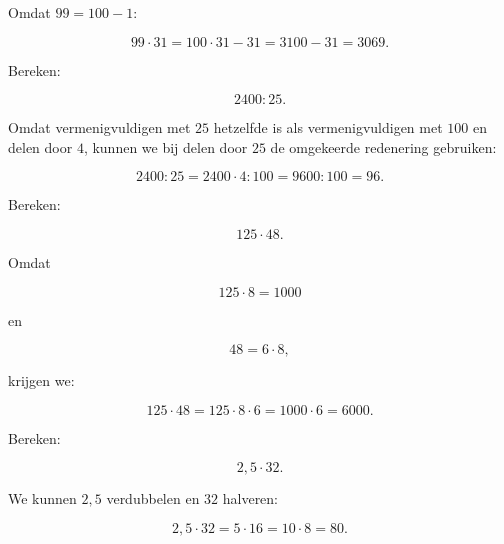 \documentclass{ximera}
\begin{document}
\begin{oefening}{\oefU\ESS}
\begin{question}
\begin{oplossing}
Omdat \(99=100-1\):

\[
99\cdot31
=
100\cdot31-31
=
3100-31
=
3069.
\]

\end{oplossing}

\end{question}


\begin{question}

Bereken:

\[
2400:25.
\]

\begin{oplossing}

Omdat vermenigvuldigen met \(25\) hetzelfde is als vermenigvuldigen met
\(100\) en delen door \(4\), kunnen we bij delen door \(25\) de omgekeerde
redenering gebruiken:

\[
2400:25
=
2400\cdot4:100
=
9600:100
=
96.
\]

\end{oplossing}

\end{question}


\begin{question}

Bereken:

\[
125\cdot48.
\]

\begin{oplossing}

Omdat

\[
125\cdot8=1000
\]

en

\[
48=6\cdot8,
\]

krijgen we:

\[
125\cdot48
=
125\cdot8\cdot6
=
1000\cdot6
=
6000.
\]

\end{oplossing}

\end{question}


\begin{question}

Bereken:

\[
2{,}5\cdot32.
\]

\begin{oplossing}

We kunnen \(2{,}5\) verdubbelen en \(32\) halveren:

\[
2{,}5\cdot32
=
5\cdot16
=
10\cdot8
=
80.
\]

\end{oplossing}

\end{question}



\end{oefening}
\end{document}
